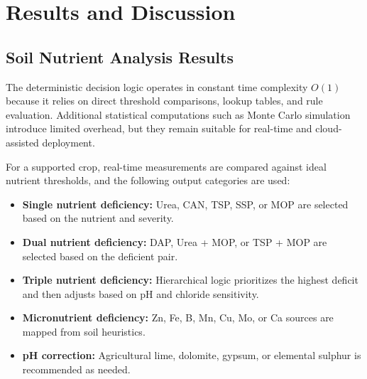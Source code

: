 \documentclass[conference]{IEEEtran}
\begin{document}
\section{Results and Discussion}

\subsection{Soil Nutrient Analysis Results}
The deterministic decision logic operates in constant time complexity $O(1)$ because it relies on direct threshold comparisons, lookup tables, and rule evaluation. Additional statistical computations such as Monte Carlo simulation introduce limited overhead, but they remain suitable for real-time and cloud-assisted deployment.

For a supported crop, real-time measurements are compared against ideal nutrient thresholds, and the following output categories are used:
\begin{itemize}
\item \textbf{Single nutrient deficiency:} Urea, CAN, TSP, SSP, or MOP are selected based on the nutrient and severity.
\item \textbf{Dual nutrient deficiency:} DAP, Urea + MOP, or TSP + MOP are selected based on the deficient pair.
\item \textbf{Triple nutrient deficiency:} Hierarchical logic prioritizes the highest deficit and then adjusts based on pH and chloride sensitivity.
\item \textbf{Micronutrient deficiency:} Zn, Fe, B, Mn, Cu, Mo, or Ca sources are mapped from soil heuristics.
\item \textbf{pH correction:} Agricultural lime, dolomite, gypsum, or elemental sulphur is recommended as needed.
\end{itemize}

\begin{table}[t]
\centering
\caption{Sample Soil Readings and Generated Recommendations}
\label{tab:soil-readings}
\end{table}
\end{document}

